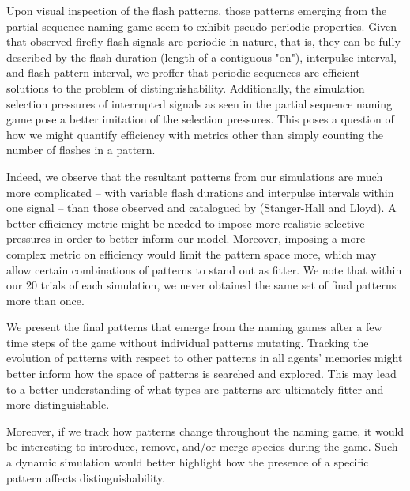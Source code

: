 
Upon visual inspection of the flash patterns, those patterns emerging from the partial sequence naming game seem to exhibit pseudo-periodic properties. 
Given that observed firefly flash signals are periodic in nature, that is, they can be fully described by the flash duration (length of a contiguous "on"), interpulse interval, and flash pattern interval, we proffer that periodic sequences are efficient solutions to the problem of distinguishability.
Additionally, the simulation selection pressures of interrupted signals as seen in the partial sequence naming game pose a better imitation of the selection pressures. 
This poses a question of how we might quantify efficiency with metrics other than simply counting the number of flashes in a pattern. 

Indeed, we observe that the resultant patterns from our simulations are much more complicated -- with variable flash durations and interpulse intervals within one signal -- than those observed and catalogued by (Stanger-Hall and Lloyd). 
A better efficiency metric might be needed to impose more realistic selective pressures in order to better inform our model.
Moreover, imposing a more complex metric on efficiency would limit the pattern space more, which may allow certain combinations of patterns to stand out as fitter. 
We note that within our 20 trials of each simulation, we never obtained the same set of final patterns more than once.

We present the final patterns that emerge from the naming games after a few time steps of the game without individual patterns mutating. 
Tracking the evolution of patterns with respect to other patterns in all agents' memories might better inform how the space of patterns is searched and explored. 
This may lead to a better understanding of what types are patterns are ultimately fitter and more distinguishable. 

Moreover, if we track how patterns change throughout the naming game, it would be interesting to introduce, remove, and/or merge species during the game. 
Such a dynamic simulation would better highlight how the presence of a specific pattern affects distinguishability. 

 

